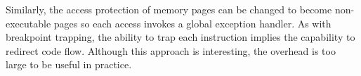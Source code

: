 Similarly, the access protection of memory pages can be changed to become non-executable pages so each access invokes a global exception handler. As with breakpoint trapping, the ability to trap each instruction implies the capability to redirect code flow. Although this approach is interesting, the overhead is too large to be useful in practice.